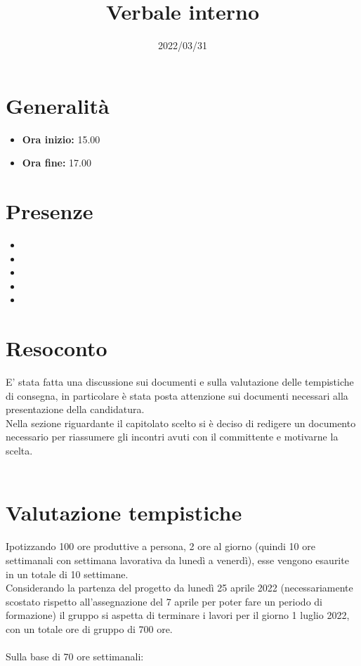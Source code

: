 \documentclass{classes/base}
\title{Verbale interno}
\date{2022/03/31}
\author{\marcob}
\renewcommand{\maketitle}{
    
}
\begin{document}
    \maketitle

    \section*{Generalità}
    \begin{itemize}
        \item \textbf{Ora inizio:} 15.00
        \item \textbf{Ora fine:} 17.00
    \end{itemize}

    \section*{Presenze}
    \begin{itemize}
    	\item \angela
        \item \marcob
        \item \tommaso
    	\item \matteo
        \item \giulio
    \end{itemize}
    
    \section*{Resoconto}
    E' stata fatta una discussione sui documenti e sulla valutazione delle tempistiche di consegna, in particolare è stata posta attenzione sui documenti necessari alla presentazione della candidatura.\\
    Nella sezione riguardante il capitolato scelto si è deciso di redigere un documento necessario per riassumere gli incontri avuti con il committente e motivarne la scelta.\\\\

    \section*{Valutazione tempistiche}
    Ipotizzando 100 ore produttive a persona, 2 ore al giorno (quindi 10 ore settimanali con settimana lavorativa da lunedì a venerdì), esse vengono esaurite in un totale di 10 settimane.\\
    Considerando la partenza del progetto da lunedì 25 aprile 2022 (necessariamente scostato rispetto all'assegnazione del 7 aprile per poter fare un periodo di formazione) il gruppo si aspetta di terminare i lavori per il giorno 1 luglio 2022, con un totale ore di gruppo di 700 ore.\\\\
    Sulla base di 70 ore settimanali:
\end{document}

